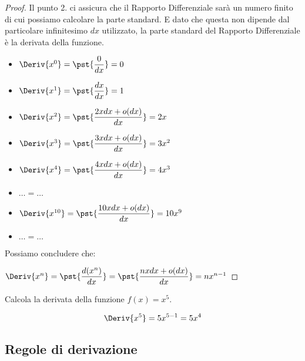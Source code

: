 \begin{proof}
Il punto 2. ci assicura che il Rapporto Differenziale sarà un numero 
finito di cui possiamo calcolare la parte standard.
E dato che questa non dipende dal particolare infinitesimo \(dx\) 
utilizzato, la parte standard del Rapporto Differenziale è la derivata della 
funzione.
\begin{multicols}{2}
\begin{itemize}
\item \(\Deriv{x^0} = \pst{\dfrac{0}{dx}} = 0\)
\item \(\Deriv{x^1} = \pst{\dfrac{dx}{dx}} = 1\)
\item \(\Deriv{x^2} = \pst{\dfrac{2xdx +o(dx)}{dx}} = 2x\)
\item \(\Deriv{x^3} = \pst{\dfrac{3xdx +o(dx)}{dx}} = 3x^2\)
\item \(\Deriv{x^4} = \pst{\dfrac{4xdx +o(dx)}{dx}} = 4x^3\)
\item \(\dots = \dots\)
\item \(\Deriv{x^{10}} = \pst{\dfrac{10xdx +o(dx)}{dx}} = 10x^9\)
\item \(\dots = \dots\)
\end{itemize}
\end{multicols}
Possiamo concludere che:

\hspace{30mm} 
\(\Deriv{x^n} = \pst{\dfrac{d(x^n)}{dx}} =
\pst{\dfrac{nxdx +o(dx)}{dx}} = nx^{n-1}\)
\end{proof}

\begin{esempio}
\label{esem:differenziazione_potenza}
Calcola la derivata della funzione \quad \(f(x)=x^5\).

\[\Deriv{x^5} = 5x^{5-1} = 5x^4\]
\end{esempio}



\subsection{Regole di derivazione}
\label{subsec:differenziazione_regole_derivazione}

